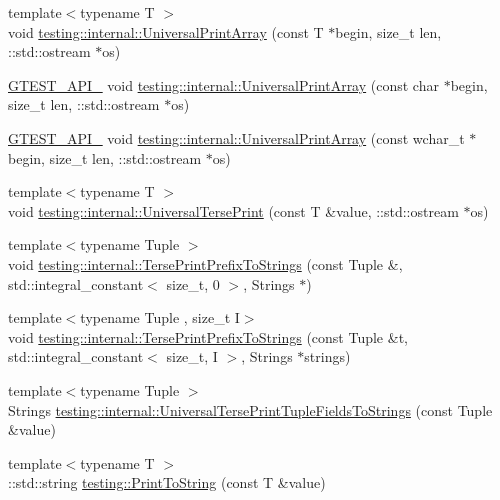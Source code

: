 \begin{DoxyCompactItemize}
\item 
{\footnotesize template$<$typename T $>$ }\\void \hyperlink{namespacetesting_1_1internal_ad79d71c3110f8eb24ab352d68f29436a}{testing\+::internal\+::\+Universal\+Print\+Array} (const T $\ast$begin, size\+\_\+t len, \+::std\+::ostream $\ast$os)
\item 
\hyperlink{gtest-port_8h_aa73be6f0ba4a7456180a94904ce17790}{G\+T\+E\+S\+T\+\_\+\+A\+P\+I\+\_\+} void \hyperlink{namespacetesting_1_1internal_a72c997dbd2c562110b2cb56c359decfa}{testing\+::internal\+::\+Universal\+Print\+Array} (const char $\ast$begin, size\+\_\+t len, \+::std\+::ostream $\ast$os)
\item 
\hyperlink{gtest-port_8h_aa73be6f0ba4a7456180a94904ce17790}{G\+T\+E\+S\+T\+\_\+\+A\+P\+I\+\_\+} void \hyperlink{namespacetesting_1_1internal_ae31e146c35fd75afc6a9cc73ae2692d1}{testing\+::internal\+::\+Universal\+Print\+Array} (const wchar\+\_\+t $\ast$begin, size\+\_\+t len, \+::std\+::ostream $\ast$os)
\item 
{\footnotesize template$<$typename T $>$ }\\void \hyperlink{namespacetesting_1_1internal_afa92f5a284929dc3723e654a25feb7b9}{testing\+::internal\+::\+Universal\+Terse\+Print} (const T \&value, \+::std\+::ostream $\ast$os)
\item 
{\footnotesize template$<$typename Tuple $>$ }\\void \hyperlink{namespacetesting_1_1internal_a6300aa1440d0019cf08d9a1f6efd4382}{testing\+::internal\+::\+Terse\+Print\+Prefix\+To\+Strings} (const Tuple \&, std\+::integral\+\_\+constant$<$ size\+\_\+t, 0 $>$, Strings $\ast$)
\item 
{\footnotesize template$<$typename Tuple , size\+\_\+t I$>$ }\\void \hyperlink{namespacetesting_1_1internal_ab244273c02742a3fac45cc241befc536}{testing\+::internal\+::\+Terse\+Print\+Prefix\+To\+Strings} (const Tuple \&t, std\+::integral\+\_\+constant$<$ size\+\_\+t, I $>$, Strings $\ast$strings)
\item 
{\footnotesize template$<$typename Tuple $>$ }\\Strings \hyperlink{namespacetesting_1_1internal_a7e60d1478b074801c766eeee9be6c772}{testing\+::internal\+::\+Universal\+Terse\+Print\+Tuple\+Fields\+To\+Strings} (const Tuple \&value)
\item 
{\footnotesize template$<$typename T $>$ }\\\+::std\+::string \hyperlink{namespacetesting_aa5717bb1144edd1d262d310ba70c82ed}{testing\+::\+Print\+To\+String} (const T \&value)
\end{DoxyCompactItemize}

